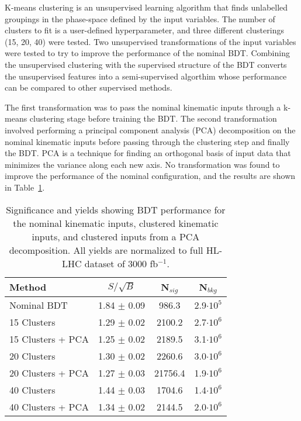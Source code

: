 \label{sec:kmeans}
K-means clustering is an unsupervised learning algorithm that finds unlabelled groupings in the phase-space defined by the input variables. The number of clusters to fit is a user-defined hyperparameter, and three different clusterings (15, 20, 40) were tested. Two unsupervised transformations of the input variables were tested to try to improve the performance of the nominal BDT. Combining the unsupervised clustering with the supervised structure of the BDT converts the unsupervised features into a semi-supervised algorthim whose  performance can be compared to other supervised methods.

The first transformation was to pass the nominal kinematic inputs through a k-means clustering stage before training the BDT. The second transformation involved performing a principal component analysis (PCA) decomposition on the nominal kinematic inputs before passing through the clustering step and finally the BDT. PCA is a technique for finding an orthogonal basis of input data that minimizes the variance along each new axis. No transformation was found to improve the performance of the nominal configuration, and the results are shown in Table~\ref{tab:bdtPCACluster}.

\begin{table}[h!]
\label{tab:bdtPCACluster}
\begin{center}
    \begin{tabular}{|l|c|c|c|} %
      \hline\hline
      \textbf{Method} & $S/\sqrt{B}$ & N$_{sig}$ & N$_{bkg}$ \\
      \hline
      Nominal BDT & 1.84 $\pm$ 0.09 & 986.3  & 2.9$\cdot 10^5$ \\
      15 Clusters & 1.29 $\pm$ 0.02 & 2100.2 & 2.7$\cdot 10^6$ \\
      15 Clusters + PCA & 1.25 $\pm$ 0.02 & 2189.5 & 3.1$\cdot 10^6$ \\         
      20 Clusters & 1.30 $\pm$ 0.02 & 2260.6 & 3.0$\cdot 10^6$ \\
      20 Clusters + PCA & 1.27 $\pm$ 0.03 & 21756.4 & 1.9$\cdot 10^6$ \\         
      40 Clusters & 1.44 $\pm$ 0.03 & 1704.6 & 1.4$\cdot 10^6$ \\
      40 Clusters + PCA & 1.34 $\pm$ 0.02 & 2144.5 & 2.0$\cdot 10^6$ \\         
      \hline\hline
    \end{tabular}
    \caption{Significance and yields showing BDT performance for the nominal kinematic inputs, clustered kinematic inputs, and clustered inputs from a PCA decomposition. All yields are normalized to full HL-LHC dataset of 3000 fb$^{-1}$.}
    \end{center}
\end{table}
